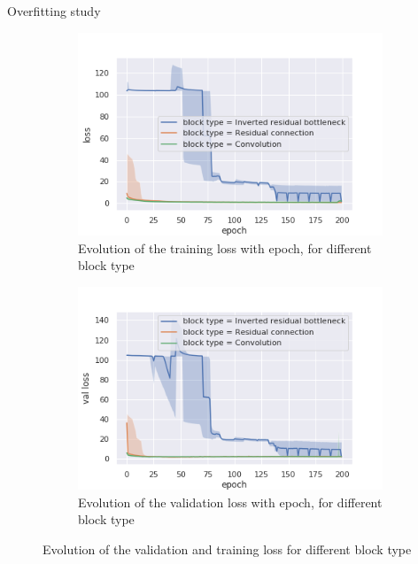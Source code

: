 \documentclass{beamer}
\begin{document}
\begin{frame}{Overfitting study}
    \begin{figure}
  \begin{center}
    \begin{subfigure}[t]{.49\linewidth}
      \centering
      \includegraphics[width=0.99\linewidth]{figures/all_epoch_loss_block_type.png}
      \caption{Evolution of the training loss with epoch, for different block type}
      \label{fig:overfitloss}
    \end{subfigure}
    \begin{subfigure}[t]{.49\linewidth}
      \centering
      \includegraphics[width=0.99\linewidth]{figures/all_epoch_val_loss_block_type.png}
      \caption{Evolution of the validation loss with epoch, for different block type}
      \label{fig:overfitvalloss}
    \end{subfigure}
    \caption{Evolution of the validation and training loss for different block type}
  \end{center}
\end{figure}
\end{frame}{}
\end{document}
